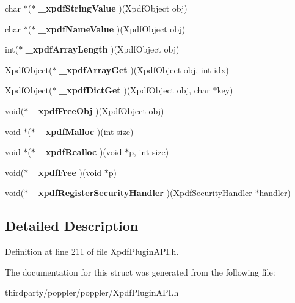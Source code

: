 \begin{DoxyCompactItemize}
\mbox{\label{struct_xpdf_plugin_vec_table_a80df82dc6170d220ec0c79d79e7d23de}} 
char $\ast$($\ast$ {\bfseries \+\_\+xpdf\+String\+Value} )(Xpdf\+Object obj)
\item 
\mbox{\label{struct_xpdf_plugin_vec_table_aa711a3e967961014b2a59137fcc9d6b2}} 
char $\ast$($\ast$ {\bfseries \+\_\+xpdf\+Name\+Value} )(Xpdf\+Object obj)
\item 
\mbox{\label{struct_xpdf_plugin_vec_table_a8c8c41eb5f0aa76f03dec0affe835ba8}} 
int($\ast$ {\bfseries \+\_\+xpdf\+Array\+Length} )(Xpdf\+Object obj)
\item 
\mbox{\label{struct_xpdf_plugin_vec_table_a788fa20ddbf5f6bda3b8a2926472e0cf}} 
Xpdf\+Object($\ast$ {\bfseries \+\_\+xpdf\+Array\+Get} )(Xpdf\+Object obj, int idx)
\item 
\mbox{\label{struct_xpdf_plugin_vec_table_a3555f2370826ac6a407b94c405009643}} 
Xpdf\+Object($\ast$ {\bfseries \+\_\+xpdf\+Dict\+Get} )(Xpdf\+Object obj, char $\ast$key)
\item 
\mbox{\label{struct_xpdf_plugin_vec_table_a64d590f92d22377692bef4b719c43e8f}} 
void($\ast$ {\bfseries \+\_\+xpdf\+Free\+Obj} )(Xpdf\+Object obj)
\item 
\mbox{\label{struct_xpdf_plugin_vec_table_a023e5ecc5064c1c8bdab0d01fce9572e}} 
void $\ast$($\ast$ {\bfseries \+\_\+xpdf\+Malloc} )(int size)
\item 
\mbox{\label{struct_xpdf_plugin_vec_table_affec78e79516aa73ad9bd7e6fafc070d}} 
void $\ast$($\ast$ {\bfseries \+\_\+xpdf\+Realloc} )(void $\ast$p, int size)
\item 
\mbox{\label{struct_xpdf_plugin_vec_table_a88a37d357a3728a42a39b72c9cc0c701}} 
void($\ast$ {\bfseries \+\_\+xpdf\+Free} )(void $\ast$p)
\item 
\mbox{\label{struct_xpdf_plugin_vec_table_a0a1f83926e113e751f5820321b048ecd}} 
void($\ast$ {\bfseries \+\_\+xpdf\+Register\+Security\+Handler} )(\hyperlink{struct_xpdf_security_handler}{Xpdf\+Security\+Handler} $\ast$handler)
\end{DoxyCompactItemize}


\subsection{Detailed Description}


Definition at line 211 of file Xpdf\+Plugin\+A\+P\+I.\+h.



The documentation for this struct was generated from the following file\+:\begin{DoxyCompactItemize}
\item 
thirdparty/poppler/poppler/Xpdf\+Plugin\+A\+P\+I.\+h\end{DoxyCompactItemize}
